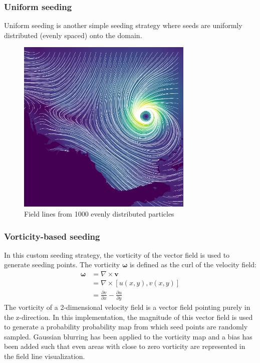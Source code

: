 \documentclass{article}
\begin{document}
\subsubsection{Uniform seeding}
Uniform seeding is another simple seeding strategy where seeds
are uniformly distributed (evenly spaced) onto the domain.
\begin{figure}[h!]
    \centering
    \includegraphics[width=0.75\textwidth, angle=270]{uniform.png}
    \caption{Field lines from 1000 evenly distributed particles}
\end{figure}

\subsubsection{Vorticity-based seeding}
In this custom seeding strategy, the vorticity of the vector field is used
to generate seeding points. The vorticity $\mathbf{\omega}$ is defined as the curl of the velocity field:
\begin{align*}
    \mathbf{\omega} &= \nabla \times \mathbf{v} \\
    &= \nabla \times \left[u(x, y), v(x, y)\right] \\
    &= \frac{\partial v}{\partial x} - \frac{\partial u}{ \partial y}
\end{align*}
The vorticity of a 2-dimensional velocity field is a vector field pointing purely in the z-direction. In this implementation, 
the magnitude of this vector field is used to generate a probability probability map from which seed points are randomly sampled.
Gaussian blurring has been applied to the vorticity map and a bias has been added such that even areas with close to zero vorticity are 
represented in the field line visualization.
\end{document}
